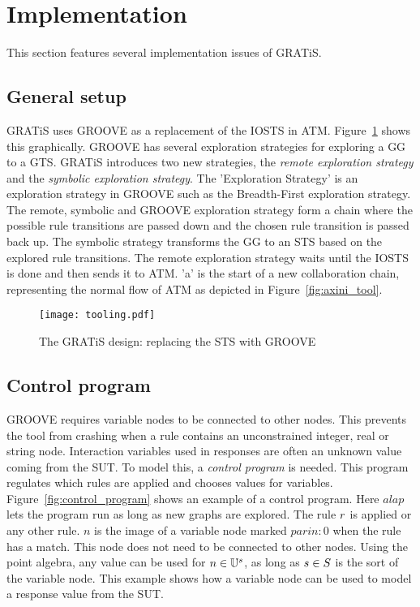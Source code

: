 \section{Implementation}\label{sec:implementation}

This section features several implementation issues of GRATiS.

\subsection{General setup}\label{sec:general-setup}
GRATiS uses GROOVE as a replacement of the IOSTS in ATM. Figure~\ref{fig:tooling} shows this graphically. GROOVE has several exploration strategies for exploring a GG to a GTS. GRATiS introduces two new strategies, the \textit{remote exploration strategy} and the \textit{symbolic exploration strategy}. The 'Exploration Strategy' is an exploration strategy in GROOVE such as the Breadth-First exploration strategy. The remote, symbolic and GROOVE exploration strategy form a chain where the possible rule transitions are passed down and the chosen rule transition is passed back up. The symbolic strategy transforms the GG to an STS based on the explored rule transitions. The remote exploration strategy waits until the IOSTS is done and then sends it to ATM. 'a' is the start of a new collaboration chain, representing the normal flow of ATM as depicted in Figure~\ref{fig:axini_tool}.

\begin{figure}[ht]
  \begin{center}
    \texttt{[image: tooling.pdf]}
  \end{center}
  \caption{The GRATiS design: replacing the STS with GROOVE}
  \label{fig:tooling}
\end{figure}

\subsection{Control program}
GROOVE requires variable nodes to be connected to other nodes. This prevents the tool from crashing when a rule contains an unconstrained integer, real or string node. Interaction variables used in responses are often an unknown value coming from the SUT. To model this, a \textit{control program} is needed. This program regulates which rules are applied and chooses values for variables. Figure~\ref{fig:control_program} shows an example of a control program. Here $alap$ lets the program run as long as new graphs are explored. The rule $r$ is applied or any other rule. $n$ is the image of a variable node marked $parin\colon 0$ when the rule has a match. This node does not need to be connected to other nodes. Using the point algebra, any value can be used for $n \in \mathbb{U}^s$, as long as $s \in S$ is the sort of the variable node. This example shows how a variable node can be used to model a response value from the SUT.

